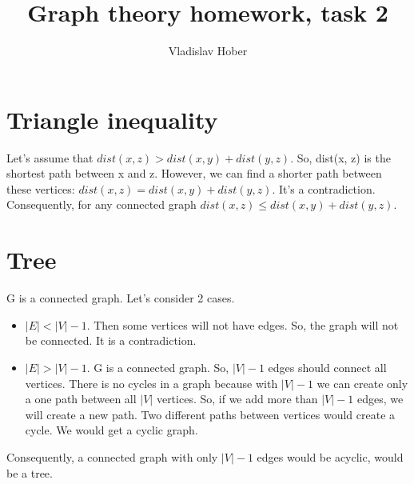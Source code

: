 \documentclass[12pt, letterpaper]{article}
\title{Graph theory homework, task 2}
\author{Vladislav Hober}
\date{}
\begin{document}
\maketitle

\section{Triangle inequality}
Let's assume that 
\begin{math}dist(x, z) > dist(x, y) + dist(y, z)\end{math}.
So, dist(x, z) is the shortest path between x and z. However, we can find a shorter path between these vertices:
\begin{math}dist(x, z) = dist(x, y) + dist(y, z)\end{math}.
It's a contradiction. Consequently, for any connected graph
\begin{math}dist(x, z) \leq dist(x, y) + dist(y, z)\end{math}.

\section{Tree}
G is a connected graph. Let's consider 2 cases.
\begin{itemize}
  \item \begin{math} |E| < |V| - 1 \end{math}.
  Then some vertices will not have edges. So, the graph will not be connected. It is a contradiction.
  \item \begin{math} |E| > |V| - 1 \end{math}. G is a connected graph. So, \begin{math}|V|-1\end{math} edges should connect all vertices. There is no cycles in a graph because with \begin{math}|V|-1\end{math}  we can create only a one path between all \begin{math}|V|\end{math} vertices. So, if we add more than \begin{math}|V|-1\end{math} edges, we will create a new path. Two different paths between vertices would create a cycle. We would get a cyclic graph.
\end{itemize}
 Consequently, a connected graph with only \begin{math}|V|-1\end{math} edges would be acyclic, would be a tree.
\end{document}
